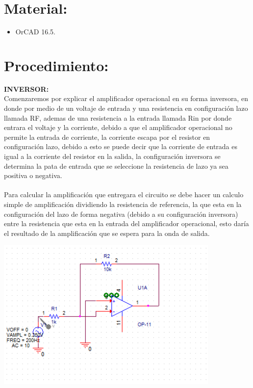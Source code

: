 \documentclass[12pt,a4paper]{article}
\begin{document}
\section{Material:}
\begin{itemize}
\item OrCAD 16.5.
\end{itemize}

\section{Procedimiento:}

\textbf{INVERSOR:\\}
Comenzaremos por explicar el amplificador operacional en su forma inversora, en donde por medio de un voltaje de entrada y una resistencia en configuración lazo llamada RF, ademas de una resistencia a la entrada llamada Rin  por donde entrara el voltaje y la corriente, debido a que el amplificador operacional no permite la entrada de corriente, la corriente  escapa por el resistor en configuración lazo, debido a esto se puede decir que la corriente de entrada es igual a la corriente del resistor en la salida, la configuración inversora se determina la pata de entrada que se seleccione la resistencia de lazo ya sea positiva o negativa.\\\\
Para calcular la amplificación que entregara el circuito se debe hacer un calculo simple de amplificación dividiendo la resistencia de referencia, la que esta en la configuración del lazo de forma negativa (debido a su configuración inversora) entre la resistencia que esta en la entrada del amplificador operacional, esto daría el resultado de la amplificación que se espera para la onda de salida.\\

\begin{center}
\includegraphics[width=11cm]{Simulaciones/inversor.png} 
\end{center}
\end{document}
